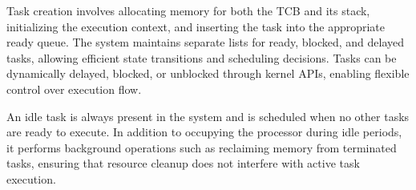 Task creation involves allocating memory for both the TCB and its stack, initializing the execution context, and inserting the task into the appropriate ready queue. The system maintains separate lists for ready, blocked, and delayed tasks, allowing efficient state transitions and scheduling decisions. Tasks can be dynamically delayed, blocked, or unblocked through kernel APIs, enabling flexible control over execution flow.

An idle task is always present in the system and is scheduled when no other tasks are ready to execute. In addition to occupying the processor during idle periods, it performs background operations such as reclaiming memory from terminated tasks, ensuring that resource cleanup does not interfere with active task execution.